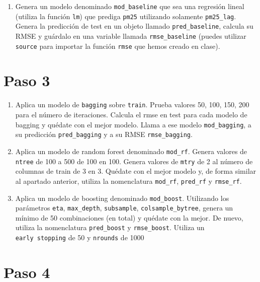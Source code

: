 \documentclass[
]{article}
\providecommand{\tightlist}{%
  \setlength{\itemsep}{0pt}\setlength{\parskip}{0pt}}
\begin{document}
\begin{enumerate}
\def\labelenumi{\arabic{enumi}.}
\setcounter{enumi}{1}
\tightlist
\item
  Genera un modelo denominado \texttt{mod\_baseline} que sea una
  regresión lineal (utiliza la función \texttt{lm}) que prediga
  \texttt{pm25} utilizando solamente \texttt{pm25\_lag}. Genera la
  predicción de test en un objeto llamado \texttt{pred\_baseline},
  calcula su RMSE y guárdalo en una variable llamada
  \texttt{rmse\_baseline} (puedes utilizar \texttt{source} para importar
  la función \texttt{rmse} que hemos creado en clase).
\end{enumerate}

\hypertarget{paso-3}{%
\section{Paso 3}\label{paso-3}}

\begin{enumerate}
\def\labelenumi{\arabic{enumi}.}
\item
  Aplica un modelo de \texttt{bagging} sobre \texttt{train}. Prueba
  valores 50, 100, 150, 200 para el número de iteraciones. Calcula el
  rmse en test para cada modelo de bagging y quédate con el mejor
  modelo. Llama a ese modelo \texttt{mod\_bagging}, a su predicción
  \texttt{pred\_bagging} y a su RMSE \texttt{rmse\_bagging}.
\item
  Aplica un modelo de random forest denominado \texttt{mod\_rf}. Genera
  valores de \texttt{ntree} de 100 a 500 de 100 en 100. Genera valores
  de \texttt{mtry} de 2 al número de columnas de train de 3 en 3.
  Quédate con el mejor modelo y, de forma similar al apartado anterior,
  utiliza la nomenclatura \texttt{mod\_rf}, \texttt{pred\_rf} y
  \texttt{rmse\_rf}.
\item
  Aplica un modelo de boosting denominado \texttt{mod\_boost}.
  Utilizando los parámetros \texttt{eta}, \texttt{max\_depth},
  \texttt{subsample}, \texttt{colsample\_bytree}, genera un mínimo de 50
  combinaciones (en total) y quédate con la mejor. De nuevo, utiliza la
  nomenclatura \texttt{pred\_boost} y \texttt{rmse\_boost}. Utiliza un
  \texttt{early\ stopping} de 50 y \texttt{nrounds} de 1000
\end{enumerate}

\hypertarget{paso-4}{%
\section{Paso 4}\label{paso-4}}
\end{document}
